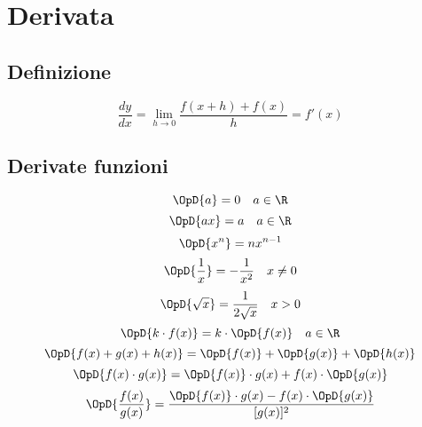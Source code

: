 \chapter{Derivata}
\section{Definizione}
\begin{equation}
\dfrac{dy}{dx}=\lim_{h \to 0}\dfrac{f(x+h)+f(x)}{h}=f'(x)
\end{equation}
\section{Derivate funzioni}
\begin{equation}
\OpD{a}=0\quad a\in\R
\end{equation}
\begin{equation}
\OpD{ax}=a\quad a\in\R
\end{equation}
\begin{equation}
\OpD{x^n}=nx^{n-1}
\end{equation}
\begin{equation}
\OpD{\dfrac{1}{x}}=-\dfrac{1}{x^2}\quad x\neq 0
\end{equation}
\begin{equation}
\OpD{\sqrt{x}}=\dfrac{1}{2\sqrt{x}}\quad x> 0
\end{equation}
\begin{equation}
\OpD{k\cdot f( x )}=k\cdot\OpD{f(x)}\quad a\in\R
\end{equation}
\begin{equation}
\OpD{f( x )+g( x )+h( x )}=\OpD{f( x )}+\OpD{g( x )}+\OpD{h( x )}
\end{equation}
\begin{equation}
\OpD{f( x )\cdot g( x )}=\OpD{f( x )}\cdot g( x )+f( x )\cdot\OpD{g( x )}
\end{equation}
\begin{equation}
\OpD{\dfrac{f( x )}{g( x )}}=\dfrac{\OpD{f( x )}\cdot g( x )-f( x )\cdot\OpD{g( x )}} {[g( x )]^2}
\end{equation}